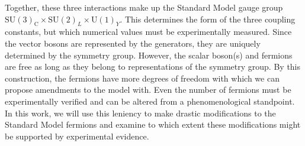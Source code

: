 Together, these three interactions make up the Standard Model gauge group $\mathrm{SU}(3)_{\mathrm{C}} \times \mathrm{SU}(2)_{L} \times \mathrm{U}(1)_{Y}$. 
This determines the form of the three coupling constants, but which numerical values must be experimentally measured. 
Since the vector bosons are represented by the generators, they are uniquely determined by the symmetry group. However, the scalar boson(s) and fermions are free as long as they
belong to representations of the symmetry group. By this construction, the fermions have more degrees of freedom with which we can propose amendments to the model with. Even the
number of fermions must be experimentally verified and can be altered from a phenomenological standpoint. In this work,
we will use this leniency to make drastic modifications to the Standard Model fermions and examine to which extent 
these modifications might be supported by experimental evidence.


% 
% 
% 